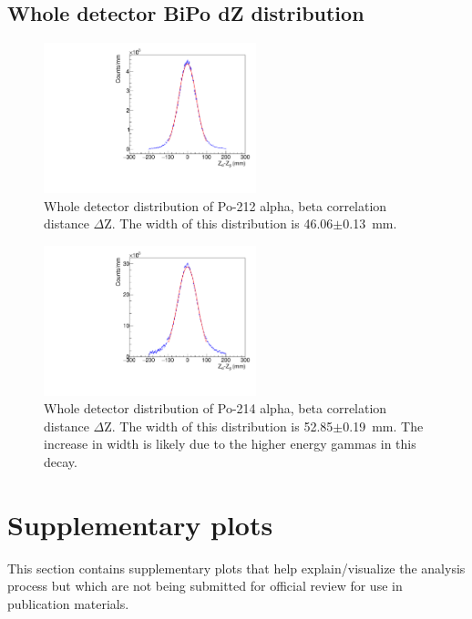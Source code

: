 \subsection{Whole detector BiPo dZ distribution}
\begin{figure}[!h]
\centering
\includegraphics[width=0.55\textwidth]{figures/PubBiPo212dZ.pdf}
\caption{\label{fig:dZ212}Whole detector distribution of Po-212 alpha, beta correlation distance $\Delta$Z. The width of this distribution is 46.06$\pm$0.13~mm.}
\end{figure}
\begin{figure}[!h]
\centering
\includegraphics[width=0.55\textwidth]{figures/PubBiPo214dZ.pdf}
\caption{\label{fig:dZ214}Whole detector distribution of Po-214 alpha, beta correlation distance $\Delta$Z. The width of this distribution is 52.85$\pm$0.19~mm. The increase in width is likely due to the higher energy gammas in this decay.}
\end{figure}
\newpage

\FloatBarrier

\section{Supplementary plots\label{sec:supp}}

This section contains supplementary plots that help explain/visualize the analysis process but which are not being submitted for official review for use in publication materials.

